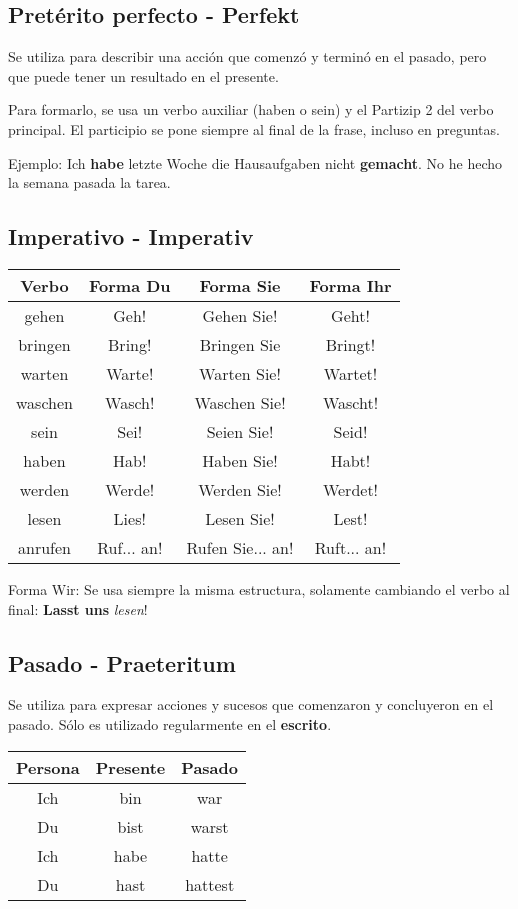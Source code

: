 \subsection{Pretérito perfecto - Perfekt}
Se utiliza para describir una acción que comenzó y terminó en el pasado, pero que puede tener un resultado en el presente.

Para formarlo, se usa un verbo auxiliar (haben o sein) y el Partizip 2 del verbo principal. El participio se pone siempre al final de la frase, incluso en preguntas.

Ejemplo: Ich \textbf{habe} letzte Woche die Hausaufgaben nicht \textbf{gemacht}. No he hecho la semana pasada la tarea.

\subsection{Imperativo - Imperativ}
\begin{tabular}{|c | c c c |}
\hline
\textbf{Verbo} & \textbf{Forma Du} & \textbf{Forma Sie} & \textbf{Forma Ihr}\\
\hline
gehen 	& Geh! 		 & Gehen Sie! 		& Geht! \\
bringen & Bring! 	 & Bringen Sie 		& Bringt! \\
warten 	& Warte! 	 & Warten Sie! 		& Wartet! \\
waschen & Wasch! 	 & Waschen Sie! 	& Wascht! \\
sein 	& Sei! 		 & Seien Sie! 		& Seid! \\
haben 	& Hab! 		 & Haben Sie! 		& Habt! \\
werden 	& Werde! 	 & Werden Sie! 		& Werdet! \\
lesen 	& Lies! 	 & Lesen Sie! 		& Lest! \\
anrufen & Ruf... an! & Rufen Sie... an! & Ruft... an!\\
\hline
\end{tabular}

Forma Wir: Se usa siempre la misma estructura, solamente cambiando el verbo al final: \textbf{Lasst uns} \textit{lesen}!



\subsection{Pasado - Praeteritum}
Se utiliza para expresar acciones y sucesos que comenzaron y concluyeron en el pasado. Sólo es utilizado regularmente en el \textbf{escrito}.

\begin{tabular}{|c | c c |}
\hline
\textbf{Persona} & \textbf{Presente} & \textbf{Pasado}\\
\hline
Ich & bin & war \\
Du & bist & warst \\
Ich & habe & hatte \\
Du & hast & hattest \\
\hline
\end{tabular}


